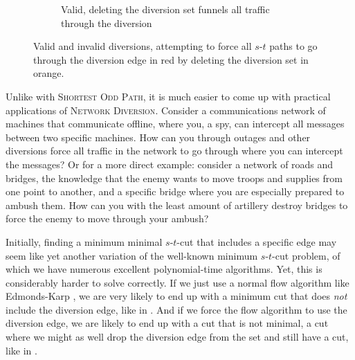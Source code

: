 \begin{figure}[H]
\begin{subfigure}{.3\textwidth}
        \caption{Valid, deleting the diversion set funnels all traffic through the diversion}
        \label{subfigure:valid-diversion}
    \end{subfigure}
    \caption{Valid and invalid diversions, attempting to force all $s$-$t$ paths to go through the diversion edge in red by deleting the diversion set in orange.}
    \label{figure:diversion-attempts}
\end{figure}

Unlike with \textsc{Shortest Odd Path}, it is much easier to come up with practical applications of \textsc{Network Diversion}. Consider a communications network of machines that communicate offline, where you, a spy, can intercept all messages between two specific machines. How can you through outages and other diversions force all traffic in the network to go through where you can intercept the messages? Or for a more direct example: consider a network of roads and bridges, the knowledge that the enemy wants to move troops and supplies from one point to another, and a specific bridge where you are especially prepared to ambush them. How can you with the least amount of artillery destroy bridges to force the enemy to move through your ambush?

Initially, finding a minimum minimal $s$-$t$-cut that includes a specific edge may seem like yet another variation of the well-known minimum $s$-$t$-cut problem, of which we have numerous excellent polynomial-time algorithms. Yet, this is considerably harder to solve correctly. If we just use a normal flow algorithm like Edmonds-Karp \cite{source:edmonds-karp-algorithn}, we are very likely to end up with a minimum cut that does \emph{not} include the diversion edge, like in . And if we force the flow algorithm to use the diversion edge, we are likely to end up with a cut that is not minimal, a cut where we might as well drop the diversion edge from the set and still have a cut, like in .

